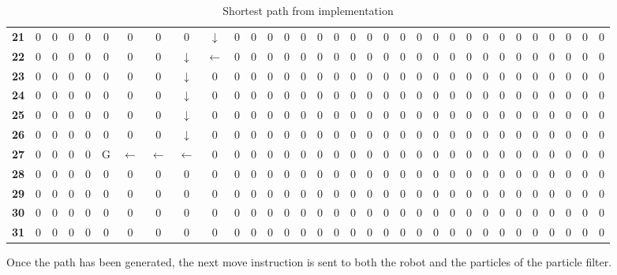 \documentclass[Main]{subfiles}
\begin{document}
\begin{table}[H]
{\begin{tabular}{ccccccccccccccccccccccccccccccccc}
			\textbf{21} &  0 &  0 &  0 &  0 &  0 &  0 &  0 &  0 &  $\downarrow$ &  0 &  0 &  0 &  0 &  0 &  0 &  0 &  0 &  0 &  0 &  0 &  0 &  0 &  0 &  0 &  0 &  0 &  0 &  0 &  0 &  0 &  0 &  0 \\
			\textbf{22} &  0 &  0 &  0 &  0 &  0 &  0 &  0 &  $\downarrow$ &  $\leftarrow$ &  0 &  0 &  0 &  0 &  0 &  0 &  0 &  0 &  0 &  0 &  0 &  0 &  0 &  0 &  0 &  0 &  0 &  0 &  0 &  0 &  0 &  0 &  0 \\
			\textbf{23} &  0 &  0 &  0 &  0 &  0 &  0 &  0 &  $\downarrow$ &  0 &  0 &  0 &  0 &  0 &  0 &  0 &  0 &  0 &  0 &  0 &  0 &  0 &  0 &  0 &  0 &  0 &  0 &  0 &  0 &  0 &  0 &  0 &  0 \\
			\textbf{24} &  0 &  0 &  0 &  0 &  0 &  0 &  0 &  $\downarrow$ &  0 &  0 &  0 &  0 &  0 &  0 &  0 &  0 &  0 &  0 &  0 &  0 &  0 &  0 &  0 &  0 &  0 &  0 &  0 &  0 &  0 &  0 &  0 &  0 \\
			\textbf{25} &  0 &  0 &  0 &  0 &  0 &  0 &  0 &  $\downarrow$ &  0 &  0 &  0 &  0 &  0 &  0 &  0 &  0 &  0 &  0 &  0 &  0 &  0 &  0 &  0 &  0 &  0 &  0 &  0 &  0 &  0 &  0 &  0 &  0 \\
			\textbf{26} &  0 &  0 &  0 &  0 &  0 &  0 &  0 &  $\downarrow$ &  0 &  0 &  0 &  0 &  0 &  0 &  0 &  0 &  0 &  0 &  0 &  0 &  0 &  0 &  0 &  0 &  0 &  0 &  0 &  0 &  0 &  0 &  0 &  0 \\
			\textbf{27} &  0 &  0 &  0 &  0 &  G &  $\leftarrow$  &  $\leftarrow$ &  $\leftarrow$ &  0 &  0 &  0 &  0 &  0 &  0 &  0 &  0 &  0 &  0 &  0 &  0 &  0 &  0 &  0 &  0 &  0 &  0 &  0 &  0 &  0 &  0 &  0 &  0 \\
			\textbf{28} &  0 &  0 &  0 &  0 &  0 &  0 &  0 &  0 &  0 &  0 &  0 &  0 &  0 &  0 &  0 &  0 &  0 &  0 &  0 &  0 &  0 &  0 &  0 &  0 &  0 &  0 &  0 &  0 &  0 &  0 &  0 &  0 \\
			\textbf{29} &  0 &  0 &  0 &  0 &  0 &  0 &  0 &  0 &  0 &  0 &  0 &  0 &  0 &  0 &  0 &  0 &  0 &  0 &  0 &  0 &  0 &  0 &  0 &  0 &  0 &  0 &  0 &  0 &  0 &  0 &  0 &  0 \\
			\textbf{30} &  0 &  0 &  0 &  0 &  0 &  0 &  0 &  0 &  0 &  0 &  0 &  0 &  0 &  0 &  0 &  0 &  0 &  0 &  0 &  0 &  0 &  0 &  0 &  0 &  0 &  0 &  0 &  0 &  0 &  0 &  0 &  0 \\
			\textbf{31} &  0 &  0 &  0 &  0 &  0 &  0 &  0 &  0 &  0 &  0 &  0 &  0 &  0 &  0 &  0 &  0 &  0 &  0 &  0 &  0 &  0 &  0 &  0 &  0 &  0 &  0 &  0 &  0 &  0 &  0 &  0 &  0 \\
			\end{tabular}
		}
		\caption{Shortest path from implementation}
		\label{table:impl_pathmap} 
	\end{table} \noindent
	Once the path has been generated, the next move instruction is sent to both the robot and the particles of the particle filter.
	
\end{document}
